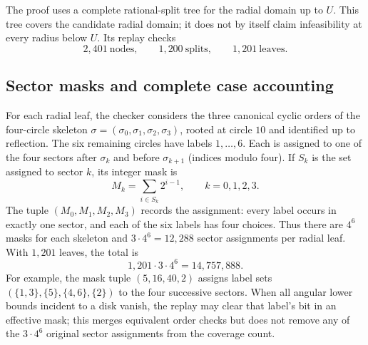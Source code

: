 \documentclass[11pt,a4paper]{article}
\theoremstyle{remark}
\newcommand{\Rcap}{U}
\begin{document}
The proof uses a complete rational-split tree for the radial domain up to
$\Rcap$.  This tree covers the candidate radial domain; it does not by itself
claim infeasibility at every radius below $\Rcap$.  Its replay checks
\[
  2{,}401\ \text{nodes},\qquad
  1{,}200\ \text{splits},\qquad
  1{,}201\ \text{leaves}.
\]
\subsection{Sector masks and complete case accounting}

For each radial leaf, the checker considers the three canonical cyclic
orders of the four-circle skeleton $\sigma=(\sigma_0,\sigma_1,\sigma_2,
\sigma_3)$, rooted at circle $10$ and identified up to reflection.  The six
remaining circles have labels $1,\ldots,6$.  Each is assigned to one of the
four sectors after $\sigma_k$ and before $\sigma_{k+1}$ (indices modulo four).
If $S_k$ is the set assigned to sector $k$, its integer mask is
\begin{equation}
  M_k=\sum_{i\in S_k}2^{i-1},\qquad k=0,1,2,3.
  \label{eq:sector-mask}
\end{equation}
The tuple $(M_0,M_1,M_2,M_3)$ records the assignment: every label occurs in
exactly one sector, and each of the six labels has four choices.  Thus there
are $4^6$ masks for each skeleton and $3\cdot4^6=12{,}288$ sector
assignments per radial leaf.  With $1{,}201$ leaves, the total is
\[
  1{,}201\cdot3\cdot4^6=14{,}757{,}888.
\]
For example, the mask tuple $(5,16,40,2)$ assigns label sets
$(\{1,3\},\{5\},\{4,6\},\{2\})$ to the four successive sectors.
When all angular lower bounds incident to a disk vanish, the replay may
clear that label's bit in an effective mask; this merges equivalent order
checks but does not remove any of the $3\cdot4^6$ original sector assignments
from the coverage count.
\end{document}
